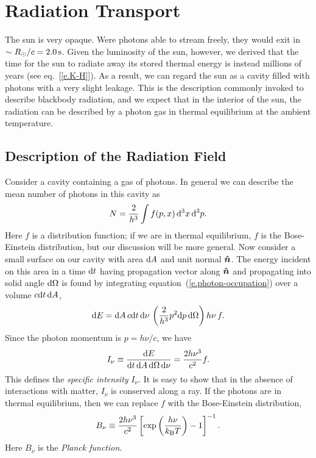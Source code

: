 \chapter{Radiation Transport}


The sun is very opaque.  Were photons able to stream freely, they would exit in $\sim R_{\odot}/c = 2.0\,\mathrm{s}$.  Given the luminosity of the sun, however, we derived that the time  for the sun to radiate away its stored thermal energy is instead millions of years (see eq.~[\ref{e.K-H}]).  As a result, we can regard the sun as a cavity filled with photons with a very slight leakage.  This is the description commonly invoked to describe blackbody radiation, and we expect that in the interior of the sun, the radiation can be described by a photon gas in thermal equilibrium at the ambient temperature.

\section{Description of the Radiation Field}

Consider a cavity containing a gas of photons. In general we can describe the mean number of photons in this cavity as
\begin{equation}\label{e.photon-occupation}
 N = \frac{2}{h^{3}}\int f(p,x)\,\mathrm{d}^{3}x\,\mathrm{d}^{3}p.
\end{equation}
Here $f$ is a distribution function; if we are in thermal equilibrium, $f$ is the Bose-Einstein distribution, but our discussion will be more general.  Now consider a small surface on our cavity with area $\mathrm{d} A$ and unit normal $\boldsymbol{\hat{n}}$.  The energy incident on this area in a time $\mathrm{d} t$ having propagation vector along $\boldsymbol{\hat{n}}$ and propagating into solid angle $\mathrm{d}\Omega$ is found by integrating equation~(\ref{e.photon-occupation}) over a volume $c\mathrm{d} t\,\mathrm{d} A$,
\[
\mathrm{d} E = \mathrm{d} A\,c\mathrm{d} t\,\mathrm{d}\nu\,\left( \frac{2}{h^{3}}p^{2}\mathrm{d} p\,\mathrm{d}\Omega\right)  h\nu \, f.
\]
Since the photon momentum is $p = h\nu/c$, we have
\begin{equation}\label{e.specific-intensity}
I_{\nu} \equiv \frac{\mathrm{d} E}{\mathrm{d} t\,\mathrm{d} A\,\mathrm{d}\Omega\,\mathrm{d}\nu} = \frac{2h\nu^{3}}{c^{2}} f.
\end{equation}
This defines the \emph{specific intensity} $I_{\nu}$.  It is easy to show that in the absence of interactions with matter, $I_{\nu}$ is conserved along a ray.  If the photons are in thermal equilibrium, then we can replace $f$ with the Bose-Einstein distribution,
\begin{equation}\label{e.Bnu}
B_{\nu} \equiv \frac{2 h\nu^{3}}{c^{2}} \left[\exp\left(\frac{h\nu}{k_\mathrm{B} T}\right)-1\right]^{-1}.
\end{equation}
Here $B_{\nu}$ is the \emph{Planck function}.

